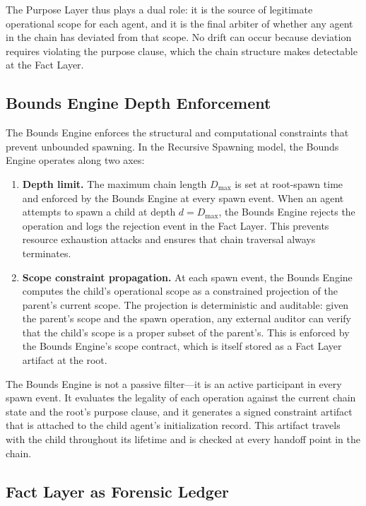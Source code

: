 The Purpose Layer thus plays a dual role: it is the source of legitimate operational scope for each agent, and it is the final arbiter of whether any agent in the chain has deviated from that scope. No drift can occur because deviation requires violating the purpose clause, which the chain structure makes detectable at the Fact Layer.

\subsection{Bounds Engine Depth Enforcement}

The Bounds Engine enforces the structural and computational constraints that prevent unbounded spawning. In the Recursive Spawning model, the Bounds Engine operates along two axes:

\begin{enumerate}
    \item \textbf{Depth limit.} The maximum chain length $D_{\max}$ is set at root-spawn time and enforced by the Bounds Engine at every spawn event. When an agent attempts to spawn a child at depth $d = D_{\max}$, the Bounds Engine rejects the operation and logs the rejection event in the Fact Layer. This prevents resource exhaustion attacks and ensures that chain traversal always terminates.
    \item \textbf{Scope constraint propagation.} At each spawn event, the Bounds Engine computes the child's operational scope as a constrained projection of the parent's current scope. The projection is deterministic and auditable: given the parent's scope and the spawn operation, any external auditor can verify that the child's scope is a proper subset of the parent's. This is enforced by the Bounds Engine's scope contract, which is itself stored as a Fact Layer artifact at the root.
\end{enumerate}

The Bounds Engine is not a passive filter—it is an active participant in every spawn event. It evaluates the legality of each operation against the current chain state and the root's purpose clause, and it generates a signed constraint artifact that is attached to the child agent's initialization record. This artifact travels with the child throughout its lifetime and is checked at every handoff point in the chain.

\subsection{Fact Layer as Forensic Ledger}

